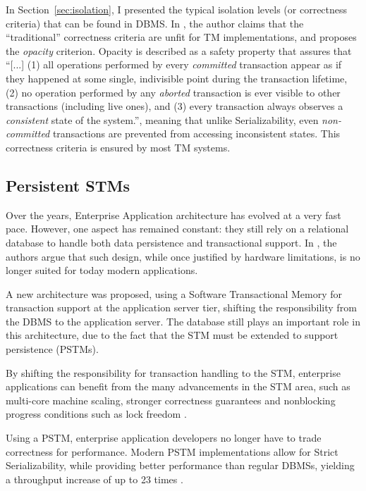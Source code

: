 \documentclass{llncs}
\begin{document}
In Section~\ref{sec:isolation}, I presented the typical isolation
levels (or correctness criteria) that can be found in DBMS. In
\cite{guerraoui2008correctness}, the author claims that the
``traditional'' correctness criteria are unfit for TM implementations,
and proposes the {\it opacity} criterion. Opacity is described as a
safety property that assures that ``[...] (1) all operations performed
by every {\it committed} transaction appear as if they happened at
some single, indivisible point during the transaction lifetime, (2) no
operation performed by any {\it aborted} transaction is ever visible
to other transactions (including live ones), and (3) every transaction
always observes a {\it consistent} state of the system.'', meaning
that unlike Serializability, even {\it non-committed} transactions are
prevented from accessing inconsistent states. This correctness
criteria is ensured by most TM systems.

\subsection{Persistent STMs}
\label{sec:pstm}

Over the years, Enterprise Application architecture has evolved at a
very fast pace. However, one aspect has remained constant: they still
rely on a relational database to handle both data persistence and
transactional support. In \cite{fernandes2011strict}, the authors
argue that such design, while once justified by hardware limitations,
is no longer suited for today modern applications.

A new architecture was proposed, using a Software Transactional Memory
for transaction support at the application server tier, shifting the
responsibility from the DBMS to the application server. The database
still plays an important role in this architecture, due to the fact
that the STM must be extended to support persistence (PSTMs).

By shifting the responsibility for transaction handling to the STM,
enterprise applications can benefit from the many advancements in the
STM area, such as multi-core machine scaling, stronger correctness
guarantees and nonblocking progress conditions such as lock freedom
\cite{fernandes2011lock}.

Using a PSTM, enterprise application developers no longer have to
trade correctness for performance. Modern PSTM implementations allow
for Strict Serializability, while providing better performance than
regular DBMSs, yielding a throughput increase of up to 23 times
\cite{fernandes2011strict}.
\end{document}
